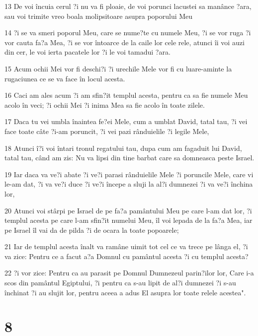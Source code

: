 \par 13 De voi încuia cerul ?i nu va fi ploaie, de voi porunci lacustei sa manânce ?ara, sau voi trimite vreo boala molipsitoare asupra poporului Meu
\par 14 ?i se va smeri poporul Meu, care se nume?te cu numele Meu, ?i se vor ruga ?i vor cauta fa?a Mea, ?i se vor întoarce de la caile lor cele rele, atunci îi voi auzi din cer, le voi ierta pacatele lor ?i le voi tamadui ?ara.
\par 15 Acum ochii Mei vor fi deschi?i ?i urechile Mele vor fi cu luare-aminte la rugaciunea ce se va face în locul acesta.
\par 16 Caci am ales acum ?i am sfin?it templul acesta, pentru ca sa fie numele Meu acolo în veci; ?i ochii Mei ?i inima Mea sa fie acolo în toate zilele.
\par 17 Daca tu vei umbla înaintea fe?ei Mele, cum a umblat David, tatal tau, ?i vei face toate câte ?i-am poruncit, ?i vei pazi rânduielile ?i legile Mele,
\par 18 Atunci î?i voi întari tronul regatului tau, dupa cum am fagaduit lui David, tatal tau, când am zis: Nu va lipsi din tine barbat care sa domneasca peste Israel.
\par 19 Iar daca va ve?i abate ?i ve?i parasi rânduielile Mele ?i poruncile Mele, care vi le-am dat, ?i va ve?i duce ?i ve?i începe a sluji la al?i dumnezei ?i va ve?i închina lor,
\par 20 Atunci voi stârpi pe Israel de pe fa?a pamântului Meu pe care l-am dat lor, ?i templul acesta pe care l-am sfin?it numelui Meu, îl voi lepada de la fa?a Mea, iar pe Israel îl vai da de pilda ?i de ocara la toate popoarele;
\par 21 Iar de templul acesta înalt va ramâne uimit tot cel ce va trece pe lânga el, ?i va zice: Pentru ce a facut a?a Domnul cu pamântul acesta ?i cu templul acesta?
\par 22 ?i vor zice: Pentru ca au parasit pe Domnul Dumnezeul parin?ilor lor, Care i-a scos din pamântul Egiptului, ?i pentru ca s-au lipit de al?i dumnezei ?i s-au închinat ?i au slujit lor, pentru aceea a adus El asupra lor toate relele acestea".

\chapter{8}

